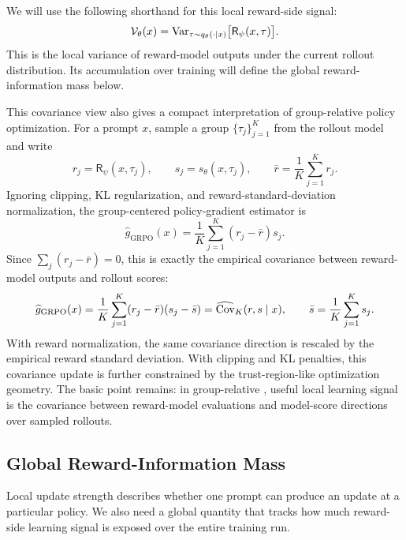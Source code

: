 We will use the following shorthand for this local reward-side signal:
\[
  \mathcal{V}_\theta(x)
  =
  \mathrm{Var}_{\tau\sim q_\theta(\cdot\mid x)}
  \big[\mathsf{R}_\psi(x,\tau)\big].
\]
This is the local variance of reward-model outputs under the current rollout distribution. Its accumulation over training will define the global reward-information mass below.

This covariance view also gives a compact interpretation of group-relative policy optimization. For a prompt $x$, sample a group $\{\tau_j\}_{j=1}^K$ from the rollout model and write
\[
  r_j=\mathsf{R}_\psi(x,\tau_j),\qquad
  s_j=s_\theta(x,\tau_j),\qquad
  \bar r=\frac{1}{K}\sum_{j=1}^K r_j.
\]
Ignoring clipping, KL regularization, and reward-standard-deviation normalization, the group-centered policy-gradient estimator is
\[
  \widehat g_{\mathrm{GRPO}}(x)
  =
  \frac{1}{K}\sum_{j=1}^K (r_j-\bar r)s_j.
\]
Since $\sum_j(r_j-\bar r)=0$, this is exactly the empirical covariance between reward-model outputs and rollout scores:
\[
  \widehat g_{\mathrm{GRPO}}(x)
  =
  \frac{1}{K}\sum_{j=1}^K
  (r_j-\bar r)(s_j-\bar s)
  =
  \widehat{\mathrm{Cov}}_{K}(r,s\mid x),
  \qquad
  \bar s=\frac{1}{K}\sum_{j=1}^K s_j.
\]
With reward normalization, the same covariance direction is rescaled by the empirical reward standard deviation. With clipping and KL penalties, this covariance update is further constrained by the trust-region-like optimization geometry. The basic point remains: in group-relative \rlvr{}, useful local learning signal is the covariance between reward-model evaluations and model-score directions over sampled rollouts.

\subsection{Global Reward-Information Mass}

Local update strength describes whether one prompt can produce an update at a particular policy. We also need a global quantity that tracks how much reward-side learning signal is exposed over the entire training run.

